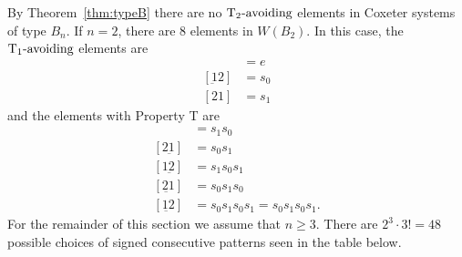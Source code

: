 By Theorem~\ref{thm:typeB} there are no $\operatorname{T_2-\mathrm{avoiding}}$ elements in  Coxeter systems of type $B_n$. If $n=2$, there are 8 elements in $W(B_2)$. In this case, the $\operatorname{T_1-\mathrm{avoiding}}$ elements are
\begin{align*}
[12] &= e\\
[\underbar{1}2]&= s_0\\
[21] &= s_1	
\end{align*}
and the elements with Property T are
\begin{align*}
[\underbar{2}1] &= s_1s_0\\
[2\underbar{1}]	&= s_0s_1\\
[1\underbar{2}] &= s_1s_0s_1\\
[\underbar{21}] &= s_0s_1s_0\\
[\underbar{12}] &= s_0s_1s_0s_1 =s_0s_1s_0s_1.
\end{align*}
For the remainder of this section we assume that $n \geq 3$. There are $2^3 \cdot 3!=48$ possible choices of signed consecutive patterns seen in the table below. 

